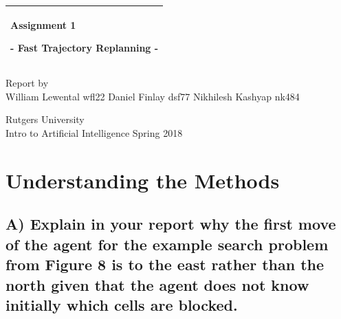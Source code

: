 \documentclass[paper=a4, fontsize=11pt]{scrartcl} %
\begin{document}
\begin{titlepage}

  \noindent
  \begin{tabular}{@{}p{\textwidth}@{}}
    \toprule[2pt]
    \midrule
    \vspace{0.2cm}
    \begin{center}
    \Huge{\textbf{
      Assignment 1
    }}
    \end{center}
    \begin{center}
      \Large{
        - Fast Trajectory Replanning -
      }
    \end{center}
    \vspace{0.2cm}\\
    \midrule
    \toprule[2pt]
  \end{tabular}
  \vspace{4 cm}
  \begin{center}
    {\large
      Report by%
    }\\
    \vspace{0.2cm}
    {\Large
      William Lewental wfl22 \break 
Daniel Finlay dsf77 \break 
Nikhilesh Kashyap nk484
    }
  \end{center}
  \vfill
  \begin{center}
  Rutgers University\\
  Intro to Artificial Intelligence Spring 2018
  \end{center}
\end{titlepage}



	\section{Understanding the Methods}
		\subsection*{ A) Explain in your report why the first move of the agent for the example search problem from Figure 8 is to the east rather than the north given that the agent does not know initially which cells are blocked.}
\end{document}
